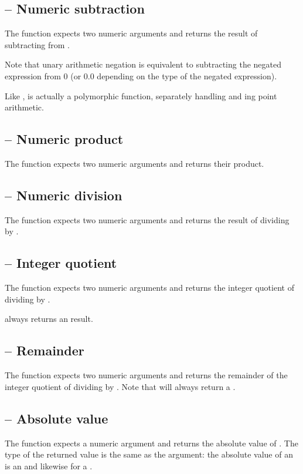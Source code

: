 \subsection{\function{-} -- Numeric subtraction}
The \function{-} function expects two numeric arguments and returns the result of subtracting  from .

Note that unary arithmetic negation is equivalent to subtracting the negated expression from 0 (or 0.0 depending on the type of the negated expression).

Like \q{+}, \q{-} is actually a polymorphic function, separately handling  and ing point arithmetic.

\subsection{\function{*} -- Numeric product}
The \function{*} function expects two numeric arguments and returns their product.

\subsection{\function{/} -- Numeric division}
The \function{/} function expects two numeric arguments and returns the result of dividing  by .

\subsection{ -- Integer quotient}
The  function expects two numeric arguments and returns the integer quotient of dividing  by .
    
 always returns an  result.

\subsection{ -- Remainder}
The  function expects two numeric arguments and returns the remainder of the integer quotient of dividing  by . Note that  will always return a .

\subsection{ -- Absolute value}
The  function expects a numeric argument and returns the absolute value of . The type of the returned value is the same as the argument: the absolute value of an  is an  and likewise for a .

